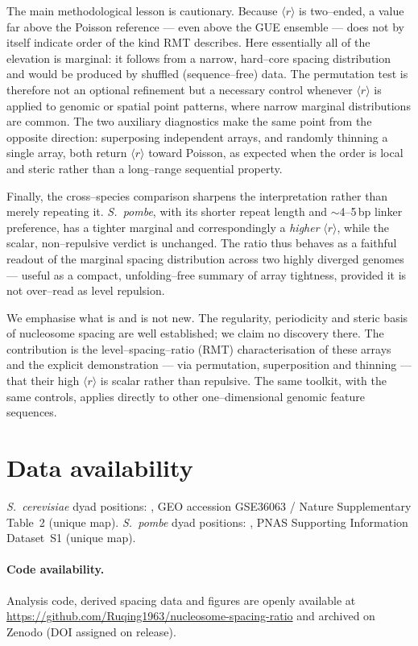 \documentclass[11pt]{article}
\renewcommand{\r}{\langle r\rangle}
\begin{document}
The main methodological lesson is cautionary. Because $\r$ is two--ended, a value
far above the Poisson reference --- even above the GUE ensemble --- does not by
itself indicate order of the kind RMT describes. Here essentially all of the
elevation is marginal: it follows from a narrow, hard--core spacing distribution
and would be produced by shuffled (sequence--free) data. The permutation test is
therefore not an optional refinement but a necessary control whenever $\r$ is
applied to genomic or spatial point patterns, where narrow marginal
distributions are common. The two auxiliary diagnostics make the same point from
the opposite direction: superposing independent arrays, and randomly thinning a
single array, both return $\r$ toward Poisson, as expected when the order is
local and steric rather than a long--range sequential property.

Finally, the cross--species comparison sharpens the interpretation rather than
merely repeating it. \textit{S.\ pombe}, with its shorter repeat length and
$\sim$4--5\,bp linker preference, has a tighter marginal and correspondingly a
\emph{higher} $\r$, while the scalar, non--repulsive verdict is unchanged. The
ratio thus behaves as a faithful readout of the marginal spacing distribution
across two highly diverged genomes --- useful as a compact, unfolding--free
summary of array tightness, provided it is not over--read as level repulsion.

We emphasise what is and is not new. The regularity, periodicity and steric
basis of nucleosome spacing are well established; we claim no discovery there.
The contribution is the level--spacing--ratio (RMT) characterisation of these
arrays and the explicit demonstration --- via permutation, superposition and
thinning --- that their high $\r$ is scalar rather than repulsive. The same
toolkit, with the same controls, applies directly to other one--dimensional
genomic feature sequences.

\section*{Data availability}
\textit{S.\ cerevisiae} dyad positions: \citet{brogaard2012}, GEO accession
GSE36063 / Nature Supplementary Table~2 (unique map). \textit{S.\ pombe} dyad
positions: \citet{moyle2013}, PNAS Supporting Information Dataset~S1 (unique
map).

\paragraph{Code availability.} Analysis code, derived spacing data and figures
are openly available at
\url{https://github.com/Ruqing1963/nucleosome-spacing-ratio} and archived on
Zenodo (DOI assigned on release).
\end{document}

